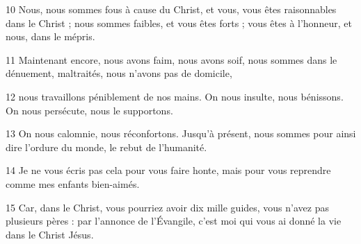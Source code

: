 
10 Nous, nous sommes fous à cause du Christ, et vous, vous êtes raisonnables dans le Christ ; nous sommes faibles, et vous êtes forts ; vous êtes à l’honneur, et nous, dans le mépris.

11 Maintenant encore, nous avons faim, nous avons soif, nous sommes dans le dénuement, maltraités, nous n’avons pas de domicile,

12 nous travaillons péniblement de nos mains. On nous insulte, nous bénissons. On nous persécute, nous le supportons.

13 On nous calomnie, nous réconfortons. Jusqu’à présent, nous sommes pour ainsi dire l’ordure du monde, le rebut de l’humanité.

14 Je ne vous écris pas cela pour vous faire honte, mais pour vous reprendre comme mes enfants bien-aimés.

15 Car, dans le Christ, vous pourriez avoir dix mille guides, vous n’avez pas plusieurs pères : par l’annonce de l’Évangile, c’est moi qui vous ai donné la vie dans le Christ Jésus.